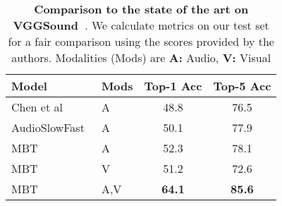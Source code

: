 \begin{table}[h]
    \centering
    \begin{tabular}{llcc}
    \toprule 
  Model & Mods & Top-1 Acc & Top-5 Acc \\
  \midrule 
  Chen et al~\cite{chen2020vggsound} & A & 48.8 & 76.5\\
  AudioSlowFast~\cite{kazakos2021slow} & A & 50.1 & 77.9 \\
  \hdashline
  MBT & A & 52.3 & 78.1\\
  MBT & V & 51.2 & 72.6 \\
  MBT & A,V & \textbf{64.1} & \textbf{85.6} \\
    \bottomrule 
    \end{tabular}
    \caption{\textbf{Comparison to the state of the art on VGGSound~\cite{chen2020vggsound}}.  We calculate metrics on our test set for a fair comparison using the scores provided by the authors. Modalities (Mods) are \textbf{A:} Audio, \textbf{V:} Visual}
    \label{tab:vggsound-sota}
\end{table}
\fi

